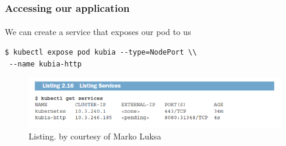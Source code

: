 \begin{frame}[fragile]
	\frametitle{Accessing our application}
	\framesubtitle{}
	We can create a service that exposes our pod to us
	\begin{lstlisting}[numbers=none, basicstyle=\ttfamily]
$ kubectl expose pod kubia --type=NodePort \\
 --name kubia-http
	\end{lstlisting}
	\begin{figure}[htbp!]
		\includegraphics[width=1\textwidth]{listings/2_16.png}
		\caption{Listing. by courtesy of Marko Luksa\cite{Luksa2018}}
		\label{fig:}
	\end{figure}
\end{frame}




